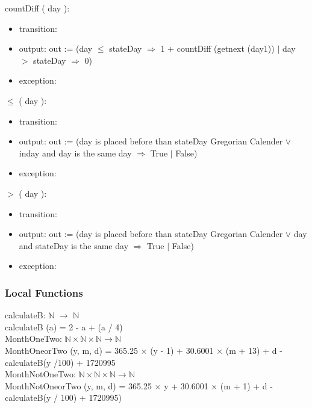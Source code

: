 \documentclass[12pt, titlepage]{article}
\begin{document}
\noindent  countDiff ( day ):
\begin{itemize}
\item transition: 
\item output: out := (day $\leq$ stateDay $\Rightarrow$ 1 + countDiff (getnext (day1)) $|$ day $>$  stateDay $\Rightarrow$ 0)
\item exception:
\end{itemize}


\noindent  $\leq$ ( day ):
\begin{itemize}
\item transition: 
\item output: out := (day is placed before than stateDay Gregorian Calender $\lor	$ inday and day is the same day $\Rightarrow$ True $|$ False)
\item exception:
\end{itemize}

\noindent $>$  ( day ):
\begin{itemize}
\item transition: 
\item output: out := (day is placed before than stateDay Gregorian Calender $\lor	$ day and stateDay is the same day $\Rightarrow$ True $|$ False)
\item exception:
\end{itemize}

\subsubsection{Local Functions}

calculateB: $\mathbb{N}$ $\rightarrow $ $\mathbb{N}$\\
calculateB (a) = 2 - a + (a / 4)\\

MonthOneTwo: $\mathbb{N} \times \mathbb{N} \times \mathbb{N} \rightarrow \mathbb{N}$\\
MonthOneorTwo (y, m, d) = 365.25 $\times$ (y - 1) + 30.6001 $\times$ (m + 13) + d - calculateB(y /100) +  1720995\\


MonthNotOneTwo: $\mathbb{N} \times \mathbb{N} \times \mathbb{N} \rightarrow \mathbb{N}$\\
MonthNotOneorTwo (y, m, d) = 365.25 $\times$ y + 30.6001 $\times$ (m + 1) + d - calculateB(y / 100) +  1720995)
\end{document}
